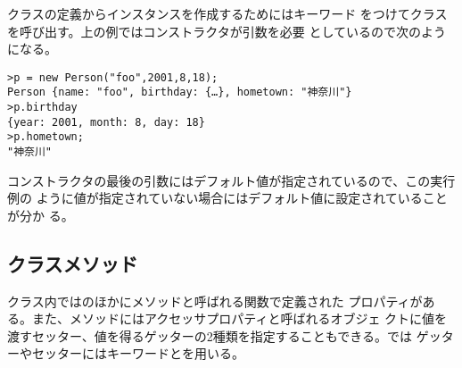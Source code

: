 クラスの定義からインスタンスを作成するためにはキーワード
をつけてクラスを呼び出す。上の例ではコンストラクタが引数を必要
としているので次のようになる。
\begin{Verbatim}
>p = new Person("foo",2001,8,18);
Person {name: "foo", birthday: {…}, hometown: "神奈川"}
>p.birthday
{year: 2001, month: 8, day: 18}
>p.hometown;
"神奈川"
\end{Verbatim}
コンストラクタの最後の引数にはデフォルト値が指定されているので、この実行例の
ように値が指定されていない場合にはデフォルト値に設定されていることが分か
る。

\subsection{クラスメソッド}
クラス内ではのほかにメソッドと呼ばれる関数で定義された
プロパティがある。また、メソッドにはアクセッサプロパティと呼ばれるオブジェ
クトに値を渡すセッター、値を得るゲッターの2種類を指定することもできる。\ES では
ゲッターやセッターにはキーワードとを用いる。
